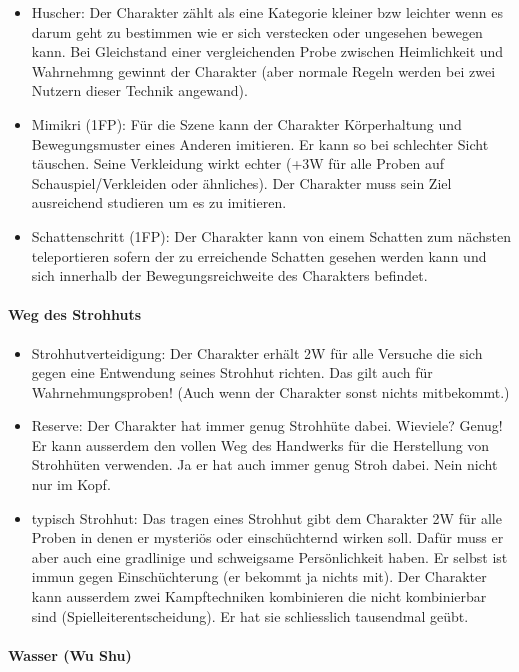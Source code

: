 \documentclass{article}
\begin{document}
\begin{itemize}
\item Huscher: Der Charakter zählt als eine Kategorie kleiner bzw leichter wenn es darum geht zu bestimmen wie er sich verstecken oder ungesehen bewegen kann. Bei Gleichstand einer vergleichenden Probe zwischen Heimlichkeit und Wahrnehmng gewinnt der Charakter (aber normale Regeln werden bei zwei Nutzern dieser Technik angewand).
\item Mimikri (1FP): Für die Szene kann der Charakter Körperhaltung und Bewegungsmuster eines Anderen imitieren. Er kann so bei schlechter Sicht täuschen. Seine Verkleidung wirkt echter (+3W für alle Proben auf Schauspiel/Verkleiden oder ähnliches). Der Charakter muss sein Ziel ausreichend studieren um es zu imitieren.
\item Schattenschritt (1FP): Der Charakter kann von einem Schatten zum nächsten teleportieren sofern der zu erreichende Schatten gesehen werden kann und sich innerhalb der Bewegungsreichweite des Charakters befindet.
\end{itemize}

\paragraph{Weg des Strohhuts}

\begin{itemize}
\item Strohhutverteidigung: Der Charakter erhält 2W für alle Versuche die sich gegen eine Entwendung seines Strohhut richten. Das gilt auch für Wahrnehmungsproben! (Auch wenn der Charakter sonst nichts mitbekommt.)
\item Reserve: Der Charakter hat immer genug Strohhüte dabei. Wieviele? Genug! Er kann ausserdem den vollen Weg des Handwerks für die Herstellung von Strohhüten verwenden. Ja er hat auch immer genug Stroh dabei. Nein nicht nur im Kopf.
\item typisch Strohhut: Das tragen eines Strohhut gibt dem Charakter 2W für alle Proben in denen er mysteriös oder einschüchternd wirken soll. Dafür muss er aber auch eine gradlinige und schweigsame Persönlichkeit haben. Er selbst ist immun gegen Einschüchterung (er bekommt ja nichts mit). Der Charakter kann ausserdem zwei Kampftechniken kombinieren die nicht kombinierbar sind (Spielleiterentscheidung). Er hat sie schliesslich tausendmal geübt.
\end{itemize}

\paragraph{Wasser (Wu Shu)}
\end{document}
